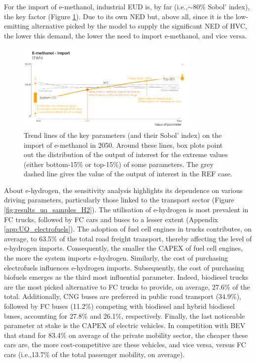 \documentclass[11pt,twoside,a4paper,english]{article}
\def\ie{i.e.,}
\begin{document}
For the import of e-methanol, industrial \gls{EUD} is, by far (\ie $\sim$80\% Sobol' index), the key factor (Figure \ref{fig:results_uq_samples_methanol}). Due to its own \gls{NED} but, above all, since it is the low-emitting alternative picked by the model to supply the significant \gls{NED} of \gls{HVC}, the lower this demand, the lower the need to import e-methanol, and vice versa. 

\begin{figure}[htbp!]
\centering
\includegraphics[width=0.8\textwidth]{UQ_Methanol_samples_2.pdf}
\caption{Trend lines of the key parameters (and their Sobol' index) on the import of e-methanol in 2050. Around these lines, box plots point out the distribution of the output of interest for the extreme values (either bottom-15\% or top-15\%) of some parameters. The grey dashed line gives the value of the output of interest in the REF case. }
\label{fig:results_uq_samples_methanol}
\end{figure}

About e-hydrogen, the sensitivity analysis highlights its dependence on various driving parameters, particularly those linked to the transport sector (Figure \ref{fig:results_uq_samples_H2}). The utilisation of e-hydrogen is most prevalent in \gls{FC} trucks, followed by \gls{FC} cars and buses to a lesser extent (Appendix \ref{app:UQ_electrofuels}). The adoption of fuel cell engines in trucks contributes, on average, to 63.5\% of the total road freight transport, thereby affecting the level of e-hydrogen imports. Consequently, the smaller the CAPEX of fuel cell engines, the more the system imports e-hydrogen. Similarly, the cost of purchasing electrofuels influences e-hydrogen imports. Subsequently, the cost of purchasing biofuels emerges as the third most influential parameter. Indeed, biodiesel trucks are the most picked alternative to \gls{FC} trucks to provide, on average, 27.6\% of the total. Additionally, \gls{CNG} buses are preferred in public road transport (34.9\%), followed by \gls{FC} buses (11.2\%) competing with biodiesel and hybrid biodiesel buses, accounting for 27.8\% and 26.1\%, respectively. Finally, the last noticeable parameter at stake is the CAPEX of electric vehicles. In competition with \gls{BEV} that stand for 83.4\% on average of the private mobility sector, the cheaper these cars are, the more cost-competitive are these vehicles, and vice versa, versus \gls{FC} cars (\ie 13.7\% of the total passenger mobility, on average).
\end{document}
